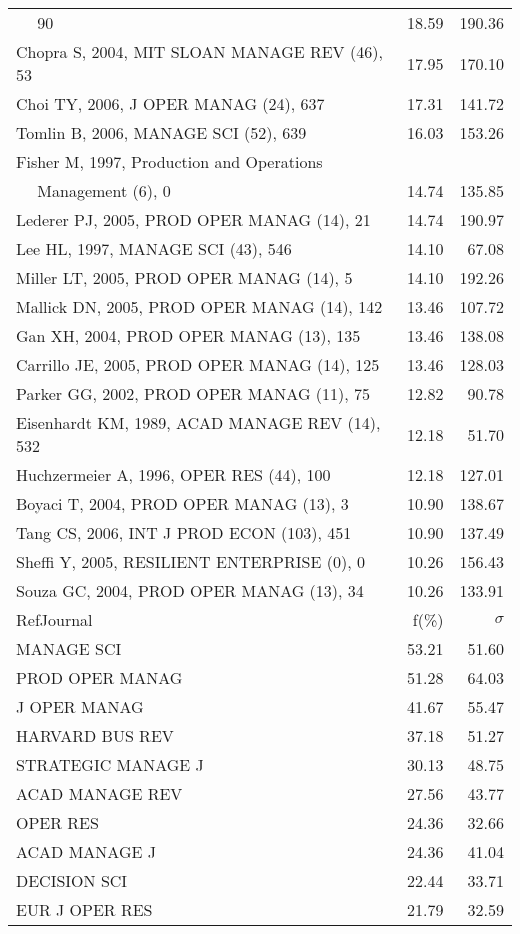 \documentclass[a4paper,11pt]{report}
\begin{document}
\begin{landscape}
\begin{table}[!ht]
{\begin{tabular}{|l r r|}
$\quad$ 90 & 18.59 & 190.36\\
Chopra S, 2004, MIT SLOAN MANAGE REV (46), 53 & 17.95 & 170.10\\
Choi TY, 2006, J OPER MANAG (24), 637 & 17.31 & 141.72\\
Tomlin B, 2006, MANAGE SCI (52), 639 & 16.03 & 153.26\\
Fisher M, 1997, Production and Operations &  & \\
$\quad$ Management (6), 0 & 14.74 & 135.85\\
Lederer PJ, 2005, PROD OPER MANAG (14), 21 & 14.74 & 190.97\\
Lee HL, 1997, MANAGE SCI (43), 546 & 14.10 & 67.08\\
Miller LT, 2005, PROD OPER MANAG (14), 5 & 14.10 & 192.26\\
Mallick DN, 2005, PROD OPER MANAG (14), 142 & 13.46 & 107.72\\
Gan XH, 2004, PROD OPER MANAG (13), 135 & 13.46 & 138.08\\
Carrillo JE, 2005, PROD OPER MANAG (14), 125 & 13.46 & 128.03\\
Parker GG, 2002, PROD OPER MANAG (11), 75 & 12.82 & 90.78\\
Eisenhardt KM, 1989, ACAD MANAGE REV (14), 532 & 12.18 & 51.70\\
Huchzermeier A, 1996, OPER RES (44), 100 & 12.18 & 127.01\\
Boyaci T, 2004, PROD OPER MANAG (13), 3 & 10.90 & 138.67\\
Tang CS, 2006, INT J PROD ECON (103), 451 & 10.90 & 137.49\\
Sheffi Y, 2005, RESILIENT ENTERPRISE (0), 0 & 10.26 & 156.43\\
Souza GC, 2004, PROD OPER MANAG (13), 34 & 10.26 & 133.91\\
\hline
\hline
RefJournal & f(\%) & $\sigma$\\
\hline
MANAGE SCI & 53.21 & 51.60\\
PROD OPER MANAG & 51.28 & 64.03\\
J OPER MANAG & 41.67 & 55.47\\
HARVARD BUS REV & 37.18 & 51.27\\
STRATEGIC MANAGE J & 30.13 & 48.75\\
ACAD MANAGE REV & 27.56 & 43.77\\
OPER RES & 24.36 & 32.66\\
ACAD MANAGE J & 24.36 & 41.04\\
DECISION SCI & 22.44 & 33.71\\
EUR J OPER RES & 21.79 & 32.59\\
\hline
\end{tabular}
}
\end{table}


\end{landscape}
\end{document}
